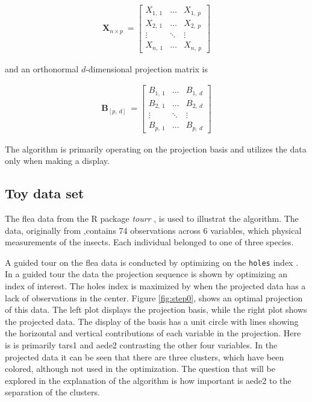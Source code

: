 \documentclass{monashthesis}
\begin{document}
\begin{align*}
  \textbf{X}_{n \times p} ~=
  \begin{bmatrix}
    X_{1,~1} & \dots  & X_{1,~p} \\
    X_{2,~1} & \dots  & X_{2,~p} \\
    \vdots   & \ddots & \vdots   \\
    X_{n,~1} & \dots  & X_{n,~p}
  \end{bmatrix}
\end{align*}

and an orthonormal \(d\)-dimensional projection matrix is

\begin{align*}
  \textbf{B}_{[p,~d]} ~=
  \begin{bmatrix}
    B_{1,~1} & \dots  & B_{1,~d} \\
    B_{2,~1} & \dots  & B_{2,~d} \\
    \vdots   & \ddots & \vdots   \\
    B_{p,~1} & \dots  & B_{p,~d}
  \end{bmatrix}
\end{align*}

The algorithm is primarily operating on the projection basis and
utilizes the data only when making a display.

\subsection{Toy data set}\label{toy-data-set}

The flea data from the R package \emph{tourr}
\autocite{wickham_tourr_2011}, is used to illustrat the algorithm. The
data, originally from \textcite{lubischew_use_1962},contains 74
observations across 6 variables, which physical measurements of the
insects. Each individual belonged to one of three species.

A guided tour on the flea data is conducted by optimizing on the
\texttt{holes} index \autocite{cook_interactive_2007}. In a guided tour
the data the projection sequence is shown by optimizing an index of
interest. The holes index is maximized by when the projected data has a
lack of observations in the center. Figure \ref{fig:step0}, shows an
optimal projection of this data. The left plot displays the projection
basis, while the right plot shows the projected data. The display of the
basis has a unit circle with lines showing the horizontal and vertical
contributions of each variable in the projection. Here is is primarily
tars1 and aede2 contrasting the other four variables. In the projected
data it can be seen that there are three clusters, which have been
colored, although not used in the optimization. The question that will
be explored in the explanation of the algorithm is how important is
aede2 to the separation of the clusters.
\end{document}
